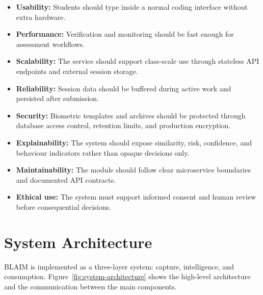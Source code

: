 \begin{itemize}
  \item \textbf{Usability:} Students should type inside a normal coding interface without extra hardware.
  \item \textbf{Performance:} Verification and monitoring should be fast enough for assessment workflows.
  \item \textbf{Scalability:} The service should support class-scale use through stateless API endpoints and external session storage.
  \item \textbf{Reliability:} Session data should be buffered during active work and persisted after submission.
  \item \textbf{Security:} Biometric templates and archives should be protected through database access control, retention limits, and production encryption.
  \item \textbf{Explainability:} The system should expose similarity, risk, confidence, and behaviour indicators rather than opaque decisions only.
  \item \textbf{Maintainability:} The module should follow clear microservice boundaries and documented API contracts.
  \item \textbf{Ethical use:} The system must support informed consent and human review before consequential decisions.
\end{itemize}

\section{System Architecture}
\label{sec:system-architecture}

BLAIM is implemented as a three-layer system: capture, intelligence, and consumption. Figure~\ref{fig:system-architecture} shows the high-level architecture and the communication between the main components.

